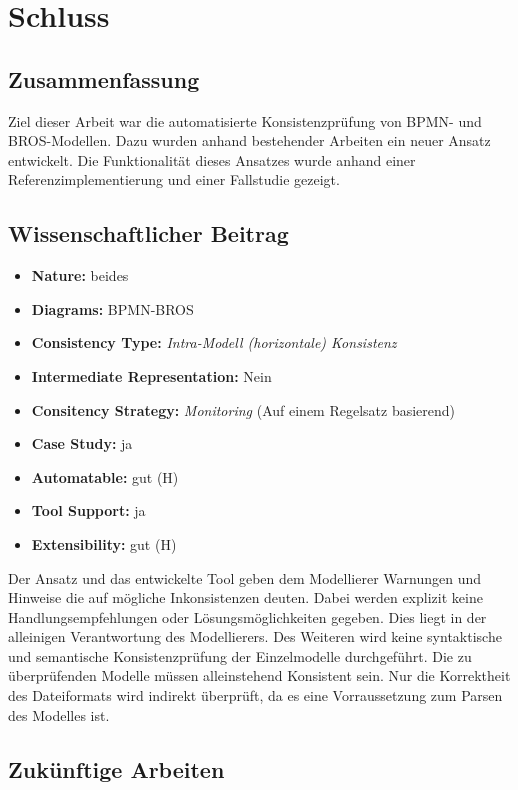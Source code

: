 \chapter{Schluss}
\label{chap:conclusion}

\section{Zusammenfassung}

Ziel dieser Arbeit war die automatisierte Konsistenzprüfung von BPMN- und BROS-Modellen.
Dazu wurden anhand bestehender Arbeiten ein neuer Ansatz entwickelt.
Die Funktionalität dieses Ansatzes wurde anhand einer Referenzimplementierung und einer Fallstudie gezeigt.  

\section{Wissenschaftlicher Beitrag}

\begin{itemize}
    \item \textbf{Nature:} beides
    \item \textbf{Diagrams:} BPMN-BROS
    \item \textbf{Consistency Type:} \emph{Intra-Modell (horizontale) Konsistenz}
    \item \textbf{Intermediate Representation:} Nein
    \item \textbf{Consitency Strategy:} \emph{Monitoring} (Auf einem Regelsatz basierend)
    \item \textbf{Case Study:} ja
    \item \textbf{Automatable:} gut (H)
    \item \textbf{Tool Support:} ja
    \item \textbf{Extensibility:} gut (H)
\end{itemize}

Der Ansatz und das entwickelte Tool geben dem Modellierer Warnungen und Hinweise die auf mögliche Inkonsistenzen deuten.
Dabei werden explizit keine Handlungsempfehlungen oder Lösungsmöglichkeiten gegeben.
Dies liegt in der alleinigen Verantwortung des Modellierers.
Des Weiteren wird keine syntaktische und semantische Konsistenzprüfung der Einzelmodelle durchgeführt.
Die zu überprüfenden Modelle müssen alleinstehend Konsistent sein.
Nur die Korrektheit des Dateiformats wird indirekt überprüft, da es eine Vorraussetzung zum Parsen des Modelles ist.

\section{Zukünftige Arbeiten}

